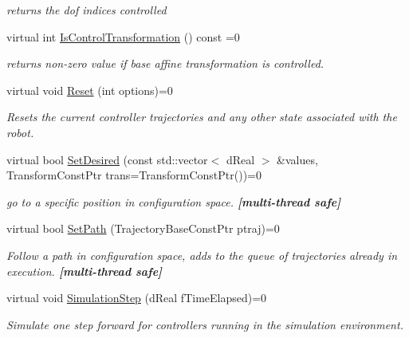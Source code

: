 \begin{DoxyCompactItemize}
\begin{DoxyCompactList}\small\item\em returns the dof indices controlled \item\end{DoxyCompactList}\item 
virtual int \hyperlink{classOpenRAVE_1_1ControllerBase_af577c7692eed532e6ed26db3dca5ef47}{IsControlTransformation} () const =0
\begin{DoxyCompactList}\small\item\em returns non-\/zero value if base affine transformation is controlled. \item\end{DoxyCompactList}\item 
virtual void \hyperlink{classOpenRAVE_1_1ControllerBase_aa495f583f5f0b3b3c412f730fdf8d715}{Reset} (int options)=0
\begin{DoxyCompactList}\small\item\em Resets the current controller trajectories and any other state associated with the robot. \item\end{DoxyCompactList}\item 
virtual bool \hyperlink{classOpenRAVE_1_1ControllerBase_accd34e8fe0dfb473777ab4668bf7a5d9}{SetDesired} (const std::vector$<$ dReal $>$ \&values, TransformConstPtr trans=TransformConstPtr())=0
\begin{DoxyCompactList}\small\item\em go to a specific position in configuration space. {\bfseries \mbox{[}multi-\/thread safe\mbox{]}} \item\end{DoxyCompactList}\item 
virtual bool \hyperlink{classOpenRAVE_1_1ControllerBase_aaab0e601177272e3bedb63f0ff5ebf32}{SetPath} (TrajectoryBaseConstPtr ptraj)=0
\begin{DoxyCompactList}\small\item\em Follow a path in configuration space, adds to the queue of trajectories already in execution. {\bfseries \mbox{[}multi-\/thread safe\mbox{]}} \item\end{DoxyCompactList}\item 
virtual void \hyperlink{classOpenRAVE_1_1ControllerBase_a43163cebf021667f69b0c6b2d357c2fa}{SimulationStep} (dReal fTimeElapsed)=0
\begin{DoxyCompactList}\small\item\em Simulate one step forward for controllers running in the simulation environment. \item\end{DoxyCompactList}\item 

\end{DoxyCompactItemize}
